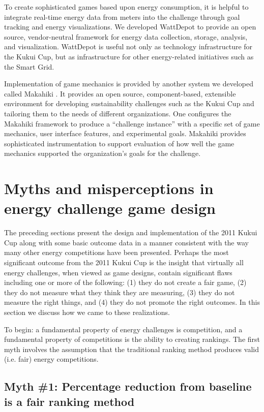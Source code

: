 \documentclass[jou]{apa} %
\begin{document}
To create sophisticated games based upon energy consumption, it is helpful to integrate
real-time energy data from meters into the challenge through goal tracking and energy
visualizations. We developed WattDepot \cite{csdl2-10-05} to provide an open
source, vendor-neutral framework for energy data collection, storage, analysis, and
visualization.  WattDepot is useful not only as technology infrastructure for the Kukui
Cup, but as infrastructure for other energy-related initiatives such as the Smart Grid.

Implementation of game mechanics is provided by another system we developed called
Makahiki \cite{csdl2-11-07}.  It provides an open source, component-based, extensible
environment for developing sustainability challenges such as the Kukui Cup and tailoring
them to the needs of different organizations.  One configures the Makahiki framework to
produce a ``challenge instance'' with a specific set of game mechanics, user interface
features, and experimental goals.  Makahiki provides sophisticated instrumentation to
support evaluation of how well the game mechanics supported the organization's goals for
the challenge.

\section{Myths and misperceptions in energy challenge game design}

The preceding sections present the design and implementation of the 2011 Kukui Cup along
with some basic outcome data in a manner consistent with the way many other energy
competitions have been presented.  Perhaps the most significant outcome from the 2011
Kukui Cup is the insight that virtually all energy challenges, when viewed as game
designs, contain significant flaws including one or more of the following: (1) they do not
create a fair game, (2) they do not measure what they think they are measuring, (3) they do not
measure the right things, and (4) they do not promote the right outcomes.  In this section we
discuss how we came to these realizations.

To begin: a fundamental property of energy challenges is competition, and a fundamental
property of competitions is the ability to creating rankings.  The first myth involves the
assumption that the traditional ranking method produces valid (i.e. fair) energy competitions.

\subsection{Myth \#1: Percentage reduction from baseline is a fair ranking method}
\end{document}
